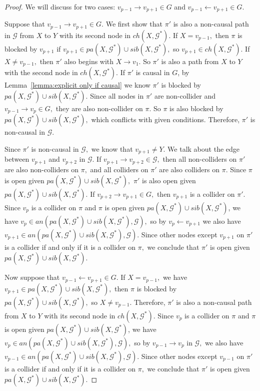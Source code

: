 \documentclass{article}
\begin{document}
\begin{proof}
We will discuss for two cases: $v_{p-1}\to v_{p+1}\in G$ and $v_{p-1}\leftarrow v_{p+1}\in G.$

Suppose that $v_{p-1}\to v_{p+1}\in G.$ We first show that $\pi'$ is also a non-causal path in $\mathcal{G}$ from $X$ to $Y$ with its second node in $ch(X,\mathcal{G}^*).$ If $X=v_{p-1},$ then $\pi$ is blocked by $v_{p+1}$ if $v_{p+1}\in pa(X,\mathcal{G}^*)\cup sib(X,\mathcal{G}^*),$ so $v_{p+1}\in ch(X,\mathcal{G}^*).$ If $X\neq v_{p-1},$ then $\pi'$ also begins with $X\to v_1.$ So $\pi'$ is also a path from $X$ to $Y$ with the second node in $ch(X,\mathcal{G}^*).$
If $\pi'$ is causal in $G$, by Lemma~\ref{lemma:explicit only if causal} we know $\pi'$ is blocked by $pa(X,\mathcal{G}^*)\cup sib(X,\mathcal{G}^*).$ Since all nodes in $\pi'$ are non-collider and $v_{p-1}\to v_p\in G,$ they are also non-collider on $\pi.$ So $\pi$ is also blocked by $pa(X,\mathcal{G}^*)\cup sib(X,\mathcal{G}^*),$ which conflicts with given conditions. Therefore, $\pi'$ is non-causal in $\mathcal{G}.$

Since $\pi'$ is non-causal in $\mathcal{G},$ we know that $v_{p+1}\neq Y.$ We talk about the edge between $v_{p+1}$ and $v_{p+2}$ in $\mathcal{G}.$ If $v_{p+1}\to v_{p+2}\in \mathcal{G},$ then all non-colliders on $\pi'$ are also non-colliders on $\pi,$ and all colliders on $\pi'$ are also colliders on $\pi.$ Since $\pi$ is open given $pa(X,\mathcal{G}^*)\cup sib(X,\mathcal{G}^*),$ $\pi'$ is also open given $pa(X,\mathcal{G}^*)\cup sib(X,\mathcal{G}^*).$ If $v_{p+2}\to v_{p+1}\in G,$ then $v_{p+1}$ is a collider on $\pi'.$ Since $v_p$ is a collider on $\pi$ and $\pi$ is open given $pa(X,\mathcal{G}^*)\cup sib(X,\mathcal{G}^*)$, we have $v_p\in an(pa(X,\mathcal{G}^*)\cup sib(X,\mathcal{G}^*), \mathcal{G}),$ so by $v_p\leftarrow v_{p+1}$ we also have $v_{p+1}\in an(pa(X,\mathcal{G}^*)\cup sib(X,\mathcal{G}^*), \mathcal{G}).$ Since other nodes except $v_{p+1}$ on $\pi'$ is a collider if and only if it is a collider on $\pi,$ we conclude that $\pi'$ is open given $pa(X,\mathcal{G}^*)\cup sib(X,\mathcal{G}^*).$

Now suppose that $v_{p-1}\leftarrow v_{p+1}\in G.$ If $X=v_{p-1},$ we have $v_{p+1}\in pa(X,\mathcal{G}^*)\cup sib(X,\mathcal{G}^*),$ then $\pi$ is blocked by $pa(X,\mathcal{G}^*)\cup sib(X,\mathcal{G}^*),$ so $X\neq v_{p-1}.$ Therefore, $\pi'$ is also a non-causal path from $X$ to $Y$ with its second node in $ch(X,\mathcal{G}^*).$ Since $v_p$ is a collider on $\pi$ and $\pi$ is open given $pa(X,\mathcal{G}^*)\cup sib(X,\mathcal{G}^*)$, we have $v_p\in an(pa(X,\mathcal{G}^*)\cup sib(X,\mathcal{G}^*), \mathcal{G}),$ so by $v_{p-1}\to v_p$ in $\mathcal{G},$ we also have $v_{p-1}\in an(pa(X,\mathcal{G}^*)\cup sib(X,\mathcal{G}^*), \mathcal{G}).$ Since other nodes except $v_{p-1}$ on $\pi'$ is a collider if and only if it is a collider on $\pi,$ we conclude that $\pi'$ is open given $pa(X,\mathcal{G}^*)\cup sib(X,\mathcal{G}^*).$
\end{proof}
\end{document}
